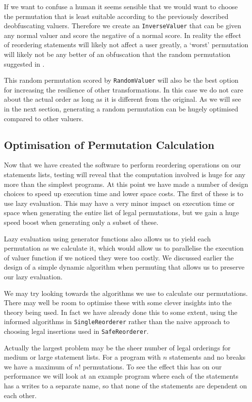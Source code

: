 \documentclass[twoside,a4paper]{report}
\begin{document}
If we want to confuse a human it seems sensible that we would want to choose the permutation that is least suitable according to the previously described
deobfuscating valuers. Therefore we create an \texttt{InverseValuer} that can be given any normal valuer and score the negative of a normal score. In
reality the effect of reordering statements will likely not affect a user greatly, a `worst' permutation will likely not be any better of an obfuscation
that the random permutation suggested in \cite{taxobftrans}.

This random permutation scored by \texttt{RandomValuer} will also be the best option for increasing the resilience of other transformations. In this case we
do not care about the actual order as long as it is different from the original. As we will see in the next section, generating a random permutation can
be hugely optimised compared to other valuers.

\subsection{Optimisation of Permutation Calculation}

Now that we have created the software to perform reordering operations on our statements lists, testing will reveal that the computation involved is huge
for any more than the simplest programs. At this point we have made a number of design choices to speed up execution time and lower space costs. The first
of these is to use lazy evaluation. This may have a very minor impact on execution time or space when generating the entire list of legal permutations, but
we gain a huge speed boost when generating only a subset of these.

Lazy evaluation using generator functions also allows us to yield each permutation as we calculate it, which would allow us to parallelise the execution of valuer
function if we noticed they were too costly. We discussed earlier the design of a simple dynamic algorithm when permuting that allows us to preserve our lazy
evaluation.

We may try looking towards the algorithms we use to calculate our permutations. There may well be room to optimise these with some clever insights into
the theory being used. In fact we have already done this to some extent, using the informed algorithms in \texttt{SingleReorderer} rather than the naive
approach to choosing legal insertions used in \texttt{SafeReorderer}.

Actually the largest problem may be the sheer number of legal orderings for medium or large statement lists. For a program with $n$ statements and no breaks
we have a maximum of $n!$ permutations. To see the effect this has on our performance we will look at an example program where each of the statements has a
writes to a separate name, so that none of the statements are dependent on each other.
\end{document}

